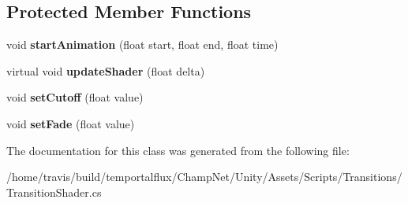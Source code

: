 \subsection*{Protected Member Functions}
\begin{DoxyCompactItemize}
\item 
\hypertarget{class_transition_shader_a583db60d60587c65cf55b74795d744b5}{void {\bfseries start\-Animation} (float start, float end, float time)}\label{class_transition_shader_a583db60d60587c65cf55b74795d744b5}

\item 
\hypertarget{class_transition_shader_ab6da38f951e0bc67a585a0a57db3148c}{virtual void {\bfseries update\-Shader} (float delta)}\label{class_transition_shader_ab6da38f951e0bc67a585a0a57db3148c}

\item 
\hypertarget{class_transition_shader_a9743abb1f7403614b4b2a861137a4a72}{void {\bfseries set\-Cutoff} (float value)}\label{class_transition_shader_a9743abb1f7403614b4b2a861137a4a72}

\item 
\hypertarget{class_transition_shader_a763066a7f1348a08dc27397a66a240b6}{void {\bfseries set\-Fade} (float value)}\label{class_transition_shader_a763066a7f1348a08dc27397a66a240b6}

\end{DoxyCompactItemize}


The documentation for this class was generated from the following file\-:\begin{DoxyCompactItemize}
\item 
/home/travis/build/temportalflux/\-Champ\-Net/\-Unity/\-Assets/\-Scripts/\-Transitions/Transition\-Shader.\-cs\end{DoxyCompactItemize}

